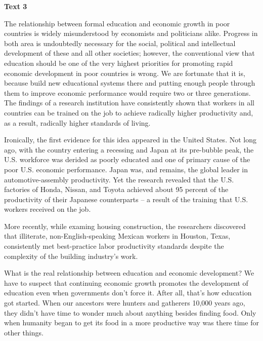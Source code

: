 
\begin{center}\textbf{Text 3}\end{center}

\qquad The relationship between formal education and economic growth in poor countries is widely misunderstood by economists and politicians alike. Progress in both area is undoubtedly necessary for the social, political and intellectual development of these and all other societies; however, the conventional view that education should be one of the very highest priorities for promoting rapid economic development in poor countries is wrong. We are fortunate that it is, because build new educational systems there and putting enough people through them to improve economic performance would require two or three generations. The findings of a research institution have consistently shown that workers in all countries can be trained on the job to achieve radically higher productivity and, as a result, radically higher standards of living.

\qquad Ironically, the first evidence for this idea appeared in the United States. Not long ago, with the country entering a recessing and Japan at its pre-bubble peak, the U.S. workforce was derided as poorly educated and one of primary cause of the poor U.S. economic performance. Japan was, and remains, the global leader in automotive-assembly productivity. Yet the research revealed that the U.S. factories of Honda, Nissan, and Toyota achieved about 95 percent of the productivity of their Japanese counterparts -- a result of the training that U.S. workers received on the job.

\qquad More recently, while examing housing construction, the researchers discovered that illiterate, non-English-speaking Mexican workers in Houston, Texas, consistently met best-practice labor productivity standards despite the complexity of the building industry's work.

\qquad What is the real relationship between education and economic development? We have to suspect that continuing economic growth promotes the development of education even when governments don't force it. After all, that's how education got started. When our ancestors were hunters and gatherers 10,000 years ago, they didn't have time to wonder much about anything besides finding food. Only when humanity began to get its food in a more productive way was there time for other things.

